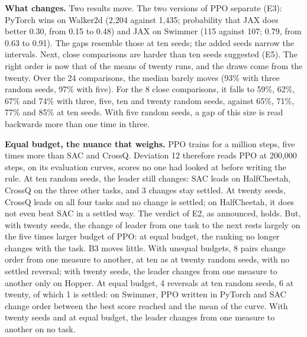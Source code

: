 \documentclass[11pt,a4paper]{article}
\begin{document}
\textbf{What changes.} Two results move. The two versions of PPO
separate (E3): PyTorch wins on Walker2d (2,204 against 1,435;
probability that JAX does better 0.30, from 0.15 to 0.48) and JAX on
Swimmer (115 against 107; 0.79, from 0.63 to 0.91). The gaps resemble
those at ten seeds; the added seeds narrow the intervals. Next, close
comparisons are harder than ten seeds suggested (E5). The right order is
now that of the means of twenty runs, and the draws come from the
twenty. Over the 24 comparisons, the median barely moves (93\% with
three random seeds, 97\% with five). For the 8 close comparisons, it
falls to 59\%, 62\%, 67\% and 74\% with three, five, ten and twenty
random seeds, against 65\%, 71\%, 77\% and 85\% at ten seeds. With five
random seeds, a gap of this size is read backwards more than one time in
three.

\textbf{Equal budget, the nuance that weighs.} PPO trains for a million
steps, five times more than SAC and CrossQ. Deviation 12 therefore reads
PPO at 200,000 steps, on its evaluation curves, scores no one had looked
at before writing the rule. At ten random seeds, the leader still
changes: SAC leads on HalfCheetah, CrossQ on the three other tasks, and
3 changes stay settled. At twenty seeds, CrossQ leads on all four tasks
and no change is settled; on HalfCheetah, it does not even beat SAC in a
settled way. The verdict of E2, as announced, holds. But, with twenty
seeds, the change of leader from one task to the next rests largely on
the five times larger budget of PPO: at equal budget, the ranking no
longer changes with the task. B3 moves little. With unequal budgets, 8
pairs change order from one measure to another, at ten as at twenty
random seeds, with no settled reversal; with twenty seeds, the leader
changes from one measure to another only on Hopper. At equal budget, 4
reversals at ten random seeds, 6 at twenty, of which 1 is settled: on
Swimmer, PPO written in PyTorch and SAC change order between the best
score reached and the mean of the curve. With twenty seeds and at equal
budget, the leader changes from one measure to another on no task.
\end{document}
